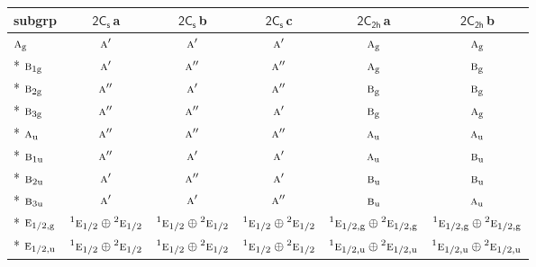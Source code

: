 \documentclass[10pt,a4paper]{article}
\numberwithin{equation}{section}
\newcommand{\grp}[1]{\mathsf{#1}}
\newcommand{\irr}[1]{\text{\normalfont\scshape #1}}
\newcommand{\conjpair}[1]{{}^{#1}}
\newcommand{\ptag}[1]{\mathrm{#1}}
\newcommand{\clsletter}[1]{\,{\scriptsize\color{black!55}#1}}
\begin{document}
{\small\begin{longtable}{@{}lccccc@{}}\toprule
subgrp & \href{2C1v.pdf}{$\grp{2C_{s}}$}\clsletter{a} & \href{2C1v.pdf}{$\grp{2C_{s}}$}\clsletter{b} & \href{2C1v.pdf}{$\grp{2C_{s}}$}\clsletter{c} & \href{2C2h.pdf}{$\grp{2C_{2h}}$}\clsletter{a} & \href{2C2h.pdf}{$\grp{2C_{2h}}$}\clsletter{b}\\\midrule\endhead
\bottomrule\endfoot\endlastfoot
$\irr{a}_{\ptag{g}}$ & $\irr{a}'$ & $\irr{a}'$ & $\irr{a}'$ & $\irr{a}_{\ptag{g}}$ & $\irr{a}_{\ptag{g}}$\\*
$\irr{b}_{1\ptag{g}}$ & $\irr{a}'$ & $\irr{a}''$ & $\irr{a}''$ & $\irr{a}_{\ptag{g}}$ & $\irr{b}_{\ptag{g}}$\\*
$\irr{b}_{2\ptag{g}}$ & $\irr{a}''$ & $\irr{a}'$ & $\irr{a}''$ & $\irr{b}_{\ptag{g}}$ & $\irr{b}_{\ptag{g}}$\\*
$\irr{b}_{3\ptag{g}}$ & $\irr{a}''$ & $\irr{a}''$ & $\irr{a}'$ & $\irr{b}_{\ptag{g}}$ & $\irr{a}_{\ptag{g}}$\\*
$\irr{a}_{\ptag{u}}$ & $\irr{a}''$ & $\irr{a}''$ & $\irr{a}''$ & $\irr{a}_{\ptag{u}}$ & $\irr{a}_{\ptag{u}}$\\*
$\irr{b}_{1\ptag{u}}$ & $\irr{a}''$ & $\irr{a}'$ & $\irr{a}'$ & $\irr{a}_{\ptag{u}}$ & $\irr{b}_{\ptag{u}}$\\*
$\irr{b}_{2\ptag{u}}$ & $\irr{a}'$ & $\irr{a}''$ & $\irr{a}'$ & $\irr{b}_{\ptag{u}}$ & $\irr{b}_{\ptag{u}}$\\*
$\irr{b}_{3\ptag{u}}$ & $\irr{a}'$ & $\irr{a}'$ & $\irr{a}''$ & $\irr{b}_{\ptag{u}}$ & $\irr{a}_{\ptag{u}}$\\*
$\irr{e}_{1/2,\ptag{g}}$ & $\conjpair{1}\irr{e}_{1/2}\oplus \conjpair{2}\irr{e}_{1/2}$ & $\conjpair{1}\irr{e}_{1/2}\oplus \conjpair{2}\irr{e}_{1/2}$ & $\conjpair{1}\irr{e}_{1/2}\oplus \conjpair{2}\irr{e}_{1/2}$ & $\conjpair{1}\irr{e}_{1/2,\ptag{g}}\oplus \conjpair{2}\irr{e}_{1/2,\ptag{g}}$ & $\conjpair{1}\irr{e}_{1/2,\ptag{g}}\oplus \conjpair{2}\irr{e}_{1/2,\ptag{g}}$\\*
$\irr{e}_{1/2,\ptag{u}}$ & $\conjpair{1}\irr{e}_{1/2}\oplus \conjpair{2}\irr{e}_{1/2}$ & $\conjpair{1}\irr{e}_{1/2}\oplus \conjpair{2}\irr{e}_{1/2}$ & $\conjpair{1}\irr{e}_{1/2}\oplus \conjpair{2}\irr{e}_{1/2}$ & $\conjpair{1}\irr{e}_{1/2,\ptag{u}}\oplus \conjpair{2}\irr{e}_{1/2,\ptag{u}}$ & $\conjpair{1}\irr{e}_{1/2,\ptag{u}}\oplus \conjpair{2}\irr{e}_{1/2,\ptag{u}}$\\
\bottomrule\end{longtable}}
\end{document}
